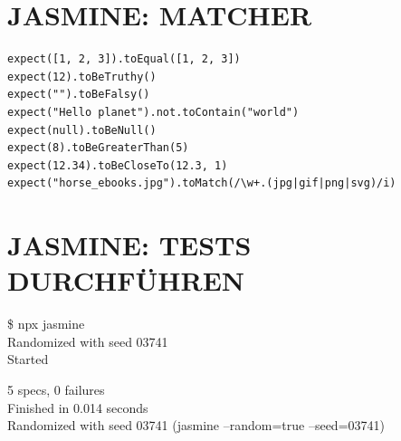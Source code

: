 \section*{JASMINE: MATCHER}
\begin{verbatim}
expect([1, 2, 3]).toEqual([1, 2, 3])
expect(12).toBeTruthy()
expect("").toBeFalsy()
expect("Hello planet").not.toContain("world")
expect(null).toBeNull()
expect(8).toBeGreaterThan(5)
expect(12.34).toBeCloseTo(12.3, 1)
expect("horse_ebooks.jpg").toMatch(/\w+.(jpg|gif|png|svg)/i)
\end{verbatim}

\section*{JASMINE: TESTS DURCHFÜHREN}
\$ npx jasmine\\
Randomized with seed 03741\\
Started

5 specs, 0 failures\\
Finished in 0.014 seconds\\
Randomized with seed 03741 (jasmine --random=true --seed=03741)\\